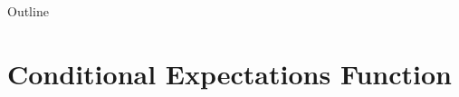 \documentclass[compress, 8pt]{beamer}
\begin{document}








\miniframesoff
\begin{frame}{Outline}
    \tableofcontents
\end{frame}
\miniframeson



\section[CEF]{Conditional Expectations Function}
\miniframesoff
\begin{frame}
    \tableofcontents[currentsection]
\end{frame}
\miniframeson
\end{document}
